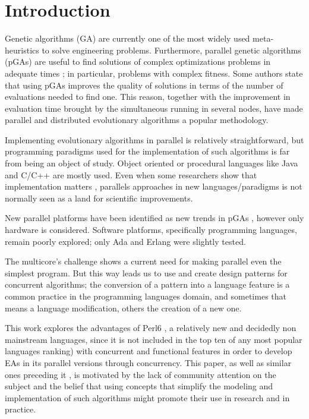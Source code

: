 \documentclass[sigconf]{acmart}
\begin{document}
\section{Introduction}

\noindent Genetic algorithms (GA) \cite{GA_Goldberg89} are currently
one of the most widely used meta-heuristics to solve engineering
problems. Furthermore, parallel genetic algorithms (pGAs) are useful
to find  solutions of complex optimizations problems in adequate times
\cite{Luque2011}; in particular, problems with complex fitness. Some
authors \cite{Alba2001} state that using pGAs improves the quality of
solutions in terms of the number of evaluations needed to find
one. This reason, together with the improvement in evaluation time
brought by the simultaneous running in several nodes, have made
parallel and distributed evolutionary algorithms a popular
methodology. 

Implementing  evolutionary algorithms in parallel is relatively straightforward,
but programming paradigms used for the implementation of such
algorithms is far from being an object of study. Object oriented or
procedural languages like Java and C/C++ are mostly used. Even when
some researchers show that implementation matters
\cite{DBLP:conf/iwann/MereloRACML11}, parallels approaches in new
languages/paradigms is not normally seen as a land for scientific
improvements. 

New parallel platforms have been identified as new trends in pGAs \cite{Luque2011}, however only hardware is considered. Software platforms, specifically programming languages, remain poorly explored; only Ada \cite{Santos2002} and Erlang \cite{A.Bienz2011,Kerdprasop2013} were slightly tested.

The multicore’s challenge \cite{SutterL05} shows a current need for making parallel even the simplest program. But this way leads us to use and create design patterns for concurrent algorithms; the conversion of a pattern into a language feature is a common practice in the programming languages domain, and sometimes that means a language modification, others the creation of a new one. 

This work explores the advantages of Perl6
\cite{Tang:2007:PRI:1190216.1190218},  a relatively new and decidedly
non mainstream languages, since it is not included in the top ten of
any most popular languages ranking) with concurrent and functional
features in order to develop EAs in its parallel versions through
concurrency. This paper, as well as similar ones preceding it \cite{DBLP:conf/gecco/CruzGGC13,Albert-Cruz2014169}, is
motivated by the lack of community attention on the subject and the
belief that using concepts that simplify the modeling and
implementation of such algorithms might promote their use in research
and in practice. 
\end{document}

